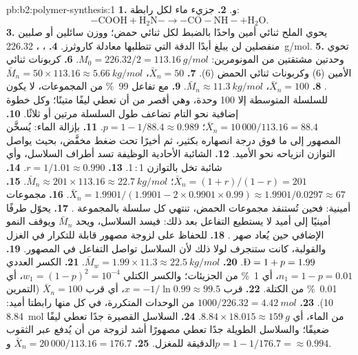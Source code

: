 \begin{solution}{pb:b2:polymer-synthesis:1}
\textbf{1.}  و.
\textbf{2.} جزيء ماء لكل رابطة:
\[\mathrm{{-}COOH + H_2N{-} \longrightarrow {-}CO{-}NH{-} + H_2O}.\]
\textbf{3.} يحوي الملح ثنائي أمين واحدًا بالضبط لكل ثنائي حمض؛ ووزن سائلين أو صلبين منفصلين
لن يبلغ أبدًا الدقة التي تتطلبها معادلة كاروثرز.
\textbf{4.} \ce{-[NH(CH2)6NH-CO(CH2)4CO]-}، ، \qty{226.32}{g/mol}.
\textbf{5.} تحوي  وحدتين مشتقتين من المونومرين: $M_0 = 226.32/2 = \qty{113.16}{g/mol}$.
\textbf{6.} كربونات ثنائي الأمين (6) وكربونات ثنائي الحمض (6).
\textbf{7.} $\bar X_n = 50$، $\bar M_n = 50 \times 113.16 \approx \qty{5.66}{kg/mol}$.
\textbf{8.} $\bar X_n = 100$، $\bar M_n \approx \qty{11.3}{kg/mol}$.
\textbf{9.} مع تفاعل 99~\% من المجموعات، لا يكون للسلسلة المتوسطة إلا 100 وحدة، وهي أقصر من أن تعطي
ليفًا متينًا؛ وكل خطوة إضافية نحو  التام تضاعف طول السلسلة مرتين أو ثلاثًا.
\textbf{10.} $\bar X_n = 10\,000/113.16 = 88.4$؛ $p = 1 - 1/88.4 \approx 0.989$.
\textbf{11.} بإزالة الماء: يُسخَّن المصهور إلى ما فوق درجة انصهاره بكثير، ثم أخيرًا تحت ضغط
مخفَّض، بحيث يواصل التوازن انزياحه نحو الأميد.
\textbf{12.} الشائبة الأحادية الوظيفة تسد أطراف السلاسل، وأي شائبة تخل بالتوازن 1\,:\,1.
\textbf{13.} $r = 1/1.01 \approx 0.990$.
\textbf{14.} $\bar X_n = (1+r)/(1-r) = 201$؛ $\bar M_n \approx 201 \times 113.16 \approx
\qty{22.7}{kg/mol}$.
\textbf{15.} $\bar X_n = 1.9901/(1.9901 - 2 \times 0.9901 \times 0.99) \approx 1.9901/0.0297 \approx
67$.
\textbf{16.} مجموعات أمينية: فحين تُستنفد مجموعات الحمض، تنتهي كل سلسلة بالمجموعة .
\textbf{17.} يحوّل طرفًا أمينيًا إلى أميد لا يستطيع التفاعل بعد ذلك: فيسد السلاسل، ويحد
$\bar M_n$ ويوقف النمو الإضافي حين يُعاد صهر .
\textbf{18.} للحفاظ على لزوجة مصهور قابلة للتكرار في الغزل والقولبة، كانت ستنجرف لولا ذلك
لأن السلاسل تواصل التفاعل في المصهور.
\textbf{19.} $\text{\DH} = 1 + p = 1.99$.
\textbf{20.} $\bar M_w = 1.99 \times 11.3 \approx \qty{22.5}{kg/mol}$.
\textbf{21.} الكسر العددي $n_1 = 1 - p = 0.01$، أي 1~\% من الجزيئات؛ والكسر الكتلي $w_1 = (1-p)^2 =
10^{-4}$، أي 0.01~\% من الكتلة.
\textbf{22.} قرب $x = -1/\ln 0.99 \approx 99.5$، أي قرب $\bar X_n = 100$ (التمرين 10).
\textbf{23.} $1000/226.32 = \qty{4.42}{mol}$ من الوحدات المتكررة، في كل منها رابطتا أميد: \qty{8.84}{mol} من
الماء، أي $8.84 \times 18.015 \approx \qty{159}{g}$.
\textbf{24.} السلاسل القصيرة جدًا تعطي ليفًا ضعيفًا؛ والسلاسل الطويلة جدًا تعطي مصهورًا أشد لزوجة من أن يُدفع
عبر الثقوب الدقيقة للمغزل.
\textbf{25.} $\bar X_n = 20\,000/113.16 = 176.7$ و$p = 1 - 1/176.7 = \boldsymbol{\approx 0.994}$.
\end{solution}
